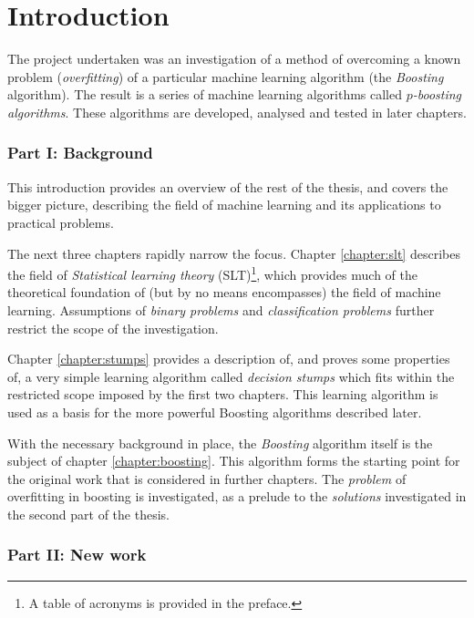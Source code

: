 
\chapter{Introduction}
\label{chapter:intro}

The project undertaken was an investigation of a method of
overcoming a known problem (\emph{overfitting}) of a particular
machine learning algorithm (the \emph{Boosting} algorithm).  The
result is a series of machine learning algorithms called
\emph{$p$-boosting algorithms}.  These algorithms are developed,
analysed and tested in later chapters.

\subsection*{Part I: Background}

This introduction provides an overview of the rest of the thesis, and
covers the bigger picture, describing the field of machine learning
and its applications to practical problems.

The next three chapters rapidly narrow the focus.  Chapter
\ref{chapter:slt} describes the field of \emph{Statistical learning
theory} (SLT)\footnote{A table of acronyms is provided in the
preface.}, which provides much of the theoretical
foundation of (but by no means encompasses) the field of machine
learning.  Assumptions of \emph{binary problems} and
\emph{classification problems} further restrict the scope of the
investigation.

Chapter \ref{chapter:stumps} provides a description of, and proves
some properties of, a very simple learning algorithm called
\emph{decision stumps} which fits within the restricted scope imposed
by the first two chapters.  This learning algorithm is used as a basis
for the more powerful Boosting algorithms described later.

With the necessary background in place, the \emph{Boosting} algorithm
itself is the subject of chapter \ref{chapter:boosting}.  This
algorithm forms the starting point for the original work that is
considered in further chapters.  The \emph{problem} of overfitting in
boosting is investigated, as a prelude to the \emph{solutions}
investigated in the second part of the thesis. 


\subsection*{Part II: New work}

